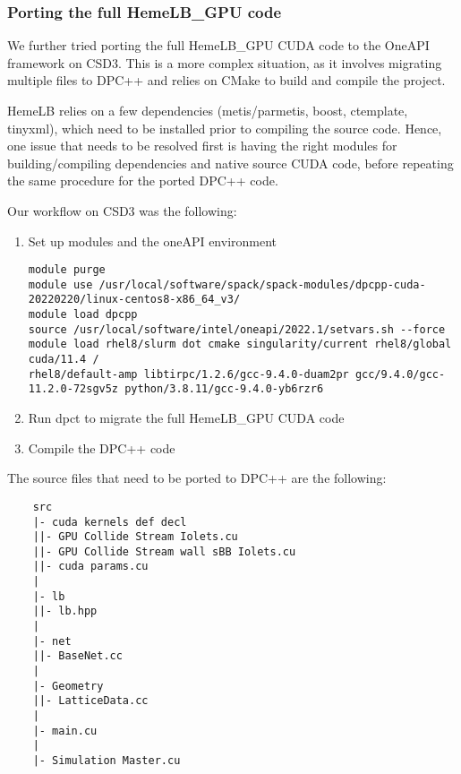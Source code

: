 \documentclass[../main]{subfiles}
\begin{document}
\subsubsection{Porting the full HemeLB\_GPU code}
We further tried porting the full HemeLB\_GPU CUDA code to the OneAPI framework on CSD3. This is a more complex situation, as it involves migrating multiple files to DPC++ and relies on CMake to build and compile the project.    

HemeLB relies on a few dependencies (metis/parmetis, boost, ctemplate, tinyxml), which need to be installed prior to compiling the source code.  
Hence, one issue that needs to be resolved first is having the right modules for building/compiling dependencies and native source CUDA code, before repeating the same procedure for the ported DPC++ code.

Our workflow on CSD3 was the following:
\begin{enumerate}
    \item Set up modules and the oneAPI environment
    \begin{verbatim}
module purge
module use /usr/local/software/spack/spack-modules/dpcpp-cuda-20220220/linux-centos8-x86_64_v3/
module load dpcpp
source /usr/local/software/intel/oneapi/2022.1/setvars.sh --force
module load rhel8/slurm dot cmake singularity/current rhel8/global cuda/11.4 /
rhel8/default-amp libtirpc/1.2.6/gcc-9.4.0-duam2pr gcc/9.4.0/gcc-11.2.0-72sgv5z python/3.8.11/gcc-9.4.0-yb6rzr6
    \end{verbatim}
    \item Run dpct to migrate the full HemeLB\_GPU CUDA code
    \item Compile the DPC++ code 
\end{enumerate}


The source files that need to be ported to DPC++ are the following: 
\begin{verbatim}
    src
    |- cuda kernels def decl
    ||- GPU Collide Stream Iolets.cu
    ||- GPU Collide Stream wall sBB Iolets.cu
    ||- cuda params.cu
    |
    |- lb
    ||- lb.hpp
    |
    |- net
    ||- BaseNet.cc
    |
    |- Geometry
    ||- LatticeData.cc
    |
    |- main.cu
    |
    |- Simulation Master.cu
\end{verbatim}
\end{document}
